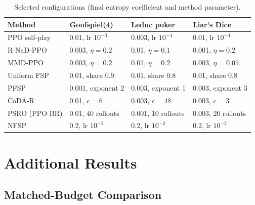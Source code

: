 \documentclass{article} %
\theoremstyle{plain}
\theoremstyle{remark}
\newcommand{\codar}{CoDA-R}
\newcommand{\rnad}{R-NaD-PPO}
\begin{document}
\begin{table}[!htbp]
\caption{Selected configurations (final entropy coefficient and method parameter).}
\label{tab:tuning}
\begin{center}
\footnotesize
\begin{tabular}{llll}
\toprule
Method & Goofspiel(4) & Leduc poker & Liar's Dice \\
\midrule
PPO self-play & 0.01, lr $10^{-3}$ & 0.003, lr $10^{-4}$ & 0.01, lr $10^{-4}$ \\
\rnad{} & 0.003, $\eta=0.2$ & 0.01, $\eta=0.1$ & 0.001, $\eta=0.2$ \\
MMD-PPO & 0.003, $\eta=0.2$ & 0.01, $\eta=0.2$ & 0.003, $\eta=0.05$ \\
Uniform FSP & 0.01, share 0.9 & 0.01, share 0.8 & 0.01, share 0.8 \\
PFSP & 0.001, exponent 2 & 0.003, exponent 1 & 0.003, exponent 3 \\
\codar{} & 0.01, $c=6$ & 0.003, $c=48$ & 0.003, $c=3$ \\
PSRO (PPO BR) & 0.01, 40 rollouts & 0.001, 10 rollouts & 0.003, 20 rollouts \\
NFSP & 0.2, lr $10^{-2}$ & 0.2, lr $10^{-2}$ & 0.2, lr $10^{-2}$ \\
\bottomrule
\end{tabular}
\end{center}
\end{table}

\FloatBarrier
\section{Additional Results}
\label{app:extra}

\subsection{Matched-Budget Comparison}
\end{document}
